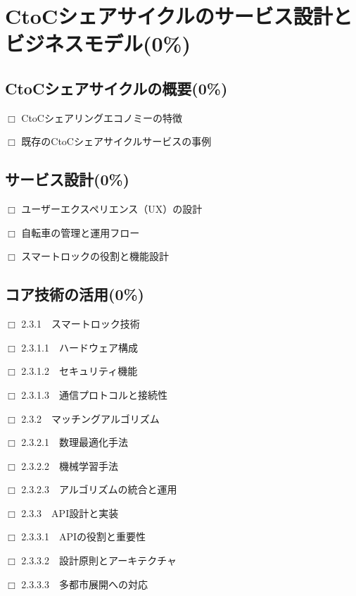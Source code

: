 \section{CtoCシェアサイクルのサービス設計とビジネスモデル(0\%)}
  \label{sec:CtoCシェアサイクルのサービス設計とビジネスモデル}
  
  \subsection{CtoCシェアサイクルの概要(0\%)}
    \label{sec:CtoCシェアサイクルの概要}
      \par $\Box$ CtoCシェアリングエコノミーの特徴
      \par $\Box$ 既存のCtoCシェアサイクルサービスの事例
      
  \subsection{サービス設計(0\%)}
    \label{sec:サービス設計}
      \par $\Box$ ユーザーエクスペリエンス（UX）の設計
      \par $\Box$ 自転車の管理と運用フロー
      \par $\Box$ スマートロックの役割と機能設計

  \subsection{コア技術の活用(0\%)}
    \label{sec:コア技術の活用}
      \par $\Box$ 2.3.1　スマートロック技術
      \par $\Box$ 2.3.1.1　ハードウェア構成
      \par $\Box$ 2.3.1.2　セキュリティ機能
      \par $\Box$ 2.3.1.3　通信プロトコルと接続性
      \par $\Box$ 2.3.2　マッチングアルゴリズム
      \par $\Box$ 2.3.2.1　数理最適化手法
      \par $\Box$ 2.3.2.2　機械学習手法
      \par $\Box$ 2.3.2.3　アルゴリズムの統合と運用
      \par $\Box$ 2.3.3　API設計と実装
      \par $\Box$ 2.3.3.1　APIの役割と重要性
      \par $\Box$ 2.3.3.2　設計原則とアーキテクチャ
      \par $\Box$ 2.3.3.3　多都市展開への対応
      
